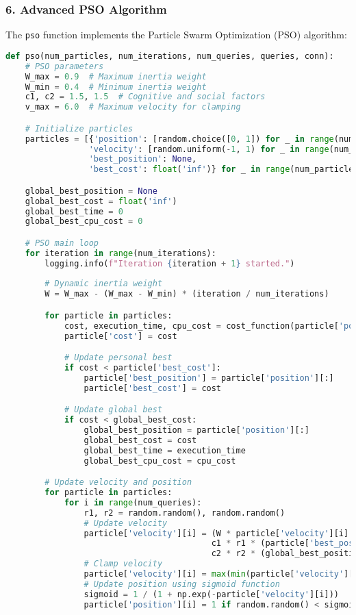 \subsubsection*{6. Advanced PSO Algorithm}
The \texttt{pso} function implements the Particle Swarm Optimization (PSO) algorithm:
\begin{lstlisting}[language=Python]
def pso(num_particles, num_iterations, num_queries, queries, conn):
    # PSO parameters
    W_max = 0.9  # Maximum inertia weight
    W_min = 0.4  # Minimum inertia weight
    c1, c2 = 1.5, 1.5  # Cognitive and social factors
    v_max = 6.0  # Maximum velocity for clamping

    # Initialize particles
    particles = [{'position': [random.choice([0, 1]) for _ in range(num_queries)],
                 'velocity': [random.uniform(-1, 1) for _ in range(num_queries)],
                 'best_position': None,
                 'best_cost': float('inf')} for _ in range(num_particles)]

    global_best_position = None
    global_best_cost = float('inf')
    global_best_time = 0
    global_best_cpu_cost = 0

    # PSO main loop
    for iteration in range(num_iterations):
        logging.info(f"Iteration {iteration + 1} started.")
        
        # Dynamic inertia weight
        W = W_max - (W_max - W_min) * (iteration / num_iterations)

        for particle in particles:
            cost, execution_time, cpu_cost = cost_function(particle['position'], queries, conn)
            particle['cost'] = cost

            # Update personal best
            if cost < particle['best_cost']:
                particle['best_position'] = particle['position'][:]
                particle['best_cost'] = cost

            # Update global best
            if cost < global_best_cost:
                global_best_position = particle['position'][:]
                global_best_cost = cost
                global_best_time = execution_time
                global_best_cpu_cost = cpu_cost

        # Update velocity and position
        for particle in particles:
            for i in range(num_queries):
                r1, r2 = random.random(), random.random()
                # Update velocity
                particle['velocity'][i] = (W * particle['velocity'][i] +
                                          c1 * r1 * (particle['best_position'][i] - particle['position'][i]) +
                                          c2 * r2 * (global_best_position[i] - particle['position'][i]))
                # Clamp velocity
                particle['velocity'][i] = max(min(particle['velocity'][i], v_max), -v_max)
                # Update position using sigmoid function
                sigmoid = 1 / (1 + np.exp(-particle['velocity'][i]))
                particle['position'][i] = 1 if random.random() < sigmoid else 0


\end{lstlisting}
